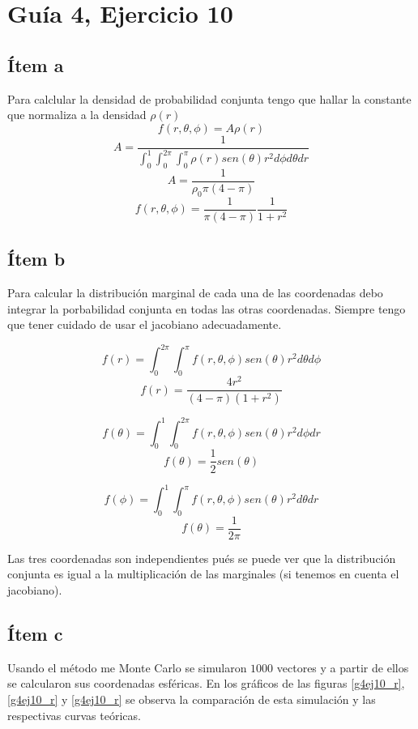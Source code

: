 \documentclass{article}
\begin{document}
\section{Guía 4, Ejercicio 10}

\subsection{Ítem a}
Para calclular la densidad de probabilidad conjunta tengo que hallar la constante que normaliza a la densidad $\rho(r)$
$$f(r, \theta, \phi) = A \rho(r) $$
$$A = \frac{1}{\int_0^1 \int_0^{2\pi} \int_0^{\pi}\rho(r) sen(\theta) r^2 d\phi d\theta dr} $$
$$A = \frac{1}{\rho_0 \pi (4 - \pi)} $$
$$f(r, \theta, \phi) = \frac{1}{\pi (4 - \pi)} \frac{1}{1 + r^2} $$

\subsection{Ítem b}
Para calcular la distribución marginal de cada una de las coordenadas debo integrar la porbabilidad conjunta en todas las otras coordenadas. Siempre tengo que tener cuidado de usar el jacobiano adecuadamente.

$$f(r) = \int_0^{2\pi}\int_0^{\pi} f(r, \theta, \phi) sen(\theta) r^2 d\theta d\phi$$
$$f(r) = \frac{4 r^2}{(4 - \pi) (1 + r^2)}$$

$$f(\theta) = \int_0^1 \int_0^{2\pi}  f(r, \theta, \phi) sen(\theta) r^2 d\phi dr$$
$$f(\theta) = \frac{1}{2} sen(\theta)$$

$$f(\phi) = \int_0^1 \int_0^{\pi}  f(r, \theta, \phi) sen(\theta) r^2 d\theta dr$$
$$f(\theta) = \frac{1}{2\pi}$$

Las tres coordenadas son independientes pués se puede ver que la distribución conjunta es igual a la multiplicación de las marginales (si tenemos en cuenta el jacobiano).

\subsection{Ítem c}

Usando el método me Monte Carlo se simularon $1000$ vectores y a partir de ellos se calcularon sus coordenadas esféricas.
En los gráficos de las figuras \ref{g4ej10_r}, \ref{g4ej10_r} y \ref{g4ej10_r} se observa la comparación de esta simulación y las respectivas curvas teóricas. 
\end{document}
